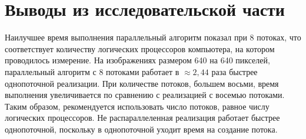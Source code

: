 \section{Выводы из исследовательской части}

Наилучшее время выполнения параллельный алгоритм показал при 8 потоках, что соответствует количеству логических процессоров компьютера, на котором проводилось измерение. На изображениях размером 640 на 640 пикселей, параллельный алгоритм с 8 потоками работает в $\approx 2,44$ раза быстрее однопоточной реализации. При количестве потоков, большем восьми, время
выполнения увеличивается по сравнению с реализацией с восемью потоками. Таким образом, рекомендуется использовать число потоков, равное числу логических процессоров.
Не распараллеленная реализация работает быстрее однопоточной, поскольку в
однопоточной уходит время на создание потока.